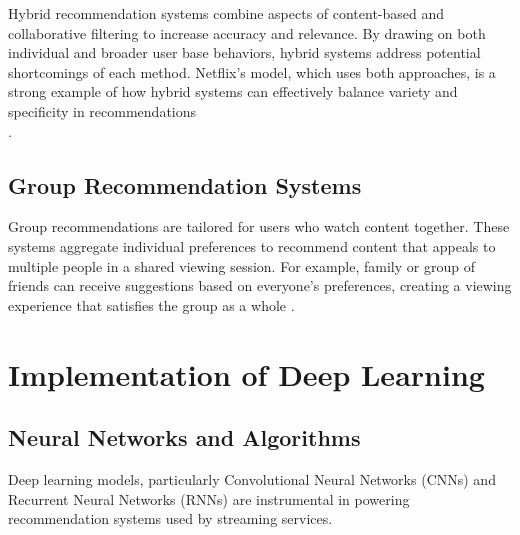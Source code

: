 \documentclass[12pt, english, a4paper]{article}
\begin{document}
\hspace*{2em}Hybrid recommendation systems combine aspects of content-based and collaborative filtering to increase accuracy and relevance. By drawing on both individual and broader user base behaviors, hybrid systems address potential shortcomings of each method. Netflix’s model, which uses both approaches, is a strong example of how hybrid systems can effectively balance variety and specificity in recommendations\\\cite{Lubos2023, Dang2021}.

\subsection{Group Recommendation Systems}

\hspace*{2em}Group recommendations are tailored for users who watch content together. These systems aggregate individual preferences to recommend content that appeals to multiple people in a shared viewing session. For example, family or group of friends can receive suggestions based on everyone’s preferences, creating a viewing experience that satisfies the group as a whole \cite{Lubos2023}.

\section{Implementation of Deep Learning}

\subsection{Neural Networks and Algorithms}

\hspace*{2em}Deep learning models, particularly Convolutional Neural Networks (CNNs) and Recurrent Neural Networks (RNNs) are instrumental in powering recommendation systems used by streaming services.
\end{document}
